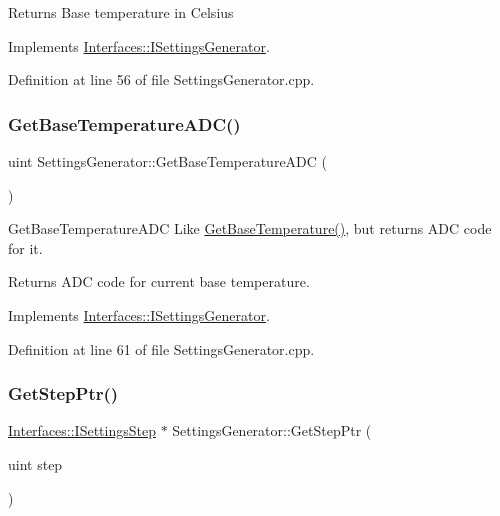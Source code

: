 \begin{DoxyReturn}{Returns}
Base temperature in Celsius 
\end{DoxyReturn}


Implements \hyperlink{class_interfaces_1_1_i_settings_generator_a9cc36185b446f21e09a0e5633f39a1c5}{Interfaces\+::\+I\+Settings\+Generator}.



Definition at line 56 of file Settings\+Generator.\+cpp.

\mbox{\label{class_settings_generator_a5f3f78597f001c127b89f6447a46df09}} 
\subsubsection{\texorpdfstring{Get\+Base\+Temperature\+A\+D\+C()}{GetBaseTemperatureADC()}}
{\footnotesize\ttfamily uint Settings\+Generator\+::\+Get\+Base\+Temperature\+A\+DC (\begin{DoxyParamCaption}{ }\end{DoxyParamCaption})\hspace{0.3cm}{\ttfamily [virtual]}}



Get\+Base\+Temperature\+A\+DC Like \hyperlink{class_settings_generator_a80b1ff8060a16d149989d98a88ab253e}{Get\+Base\+Temperature()}, but returns A\+DC code for it. 

\begin{DoxyReturn}{Returns}
A\+DC code for current base temperature. 
\end{DoxyReturn}


Implements \hyperlink{class_interfaces_1_1_i_settings_generator_a1000ff41c6eecdb55a46c859ca0ebe67}{Interfaces\+::\+I\+Settings\+Generator}.



Definition at line 61 of file Settings\+Generator.\+cpp.

\mbox{\label{class_settings_generator_a37f4175a0ed24853b2f187f15505086b}} 
\subsubsection{\texorpdfstring{Get\+Step\+Ptr()}{GetStepPtr()}}
{\footnotesize\ttfamily \hyperlink{class_interfaces_1_1_i_settings_step}{Interfaces\+::\+I\+Settings\+Step} $\ast$ Settings\+Generator\+::\+Get\+Step\+Ptr (\begin{DoxyParamCaption}\item[{uint}]{step }\end{DoxyParamCaption})\hspace{0.3cm}{\ttfamily [virtual]}}



